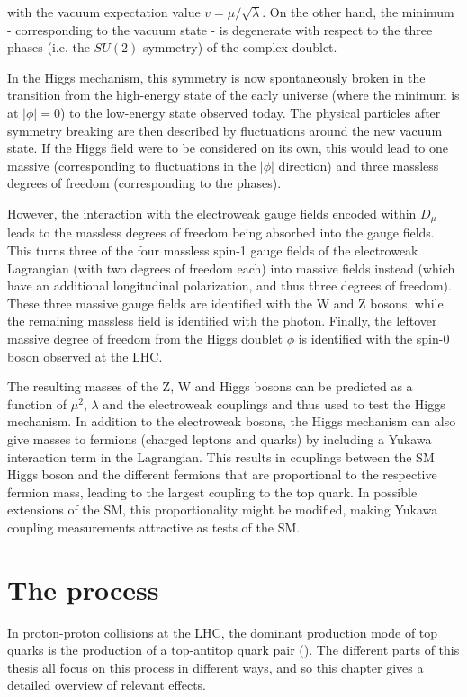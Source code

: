 \noindent with the vacuum expectation value $v = \mu / \sqrt{\lambda}$. On the other hand, the minimum - corresponding to the vacuum state - is degenerate with respect to the three phases (i.e. the $SU(2)$ symmetry) of the complex doublet.

In the Higgs mechanism, this symmetry is now spontaneously broken in the transition from the high-energy state of the early universe (where the minimum is at $|\phi| = 0$) to the low-energy state observed today. The physical particles after symmetry breaking are then described by fluctuations around the new vacuum state. If the Higgs field were to be considered on its own, this would lead to one massive (corresponding to fluctuations in the $|\phi|$ direction) and three massless degrees of freedom (corresponding to the phases).

However, the interaction with the electroweak gauge fields encoded within $D_\mu$ leads to the massless degrees of freedom being absorbed into the gauge fields. This turns three of the four massless spin-1 gauge fields of the electroweak Lagrangian (with two degrees of freedom each) into massive fields instead (which have an additional longitudinal polarization, and thus three degrees of freedom). These three massive gauge fields are identified with the W and Z bosons, while the remaining massless field is identified with the photon. Finally, the leftover massive degree of freedom from the Higgs doublet $\phi$ is identified with the spin-0 boson observed at the LHC.

The resulting masses of the Z, W and Higgs bosons can be predicted as a function of $\mu^2$, $\lambda$ and the electroweak couplings and thus used to test the Higgs mechanism. In addition to the electroweak bosons, the Higgs mechanism can also give masses to fermions (charged leptons and quarks) by including a Yukawa interaction term in the Lagrangian. This results in couplings between the SM Higgs boson and the different fermions that are proportional to the respective fermion mass, leading to the largest coupling to the top quark. In possible extensions of the SM, this proportionality might be modified, making Yukawa coupling measurements attractive as tests of the SM.

\section{The \texorpdfstring{\pptt}{pp -> tt} process}
\label{sec:theory:ttbar}

In proton-proton collisions at the LHC, the dominant production mode of top quarks is the production of a top-antitop quark pair (\ttbar). The different parts of this thesis all focus on this process in different ways, and so this chapter gives a detailed overview of relevant effects.

